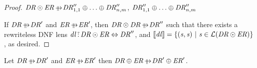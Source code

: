 \documentclass[numbers,10pt,preprint\ifanon ,nocopyrightspace\fi]{sigplanconf}
\begin{document}
\begin{proof}
  $\DNFRegex \ConcatDNF \DNFRegexAlt \ParallelRewrite
  \DNFRegex_{1,1}'' \OrDNF \ldots \OrDNF \DNFRegex_{n,m}''$,
  $\mathit{DR}_{1,1}'' \oplus \ldots \oplus \mathit{DR}_{n,m}''$
  
  If $\DNFRegex \ParallelRewrite \DNFRegex'$ and
  $\DNFRegexAlt \ParallelRewrite \DNFRegexAlt'$, then
  $\DNFRegex \ConcatDNF \DNFRegex \ParallelRewrite \DNFRegex''$ such that there
  exists a rewriteless DNF lens
  $\mathit{dl} \,\tilde{:}\,
  \mathit{DR} \odot \mathit{ER} \Leftrightarrow \mathit{DR}''$, and
  $[ \! [\mathit{dl}] \! ] =
  \{(\mathit{s},\mathit{s}) ~|~ \mathit{s} \in
    \mathcal{L}(\mathit{DR} \odot \mathit{ER})\}$,
  as desired.
\end{proof}

\begin{lemma}
  \label{lem:parallel-rewrite-or}
  Let $\DNFRegex \ParallelRewrite \DNFRegex'$ and $\DNFRegexAlt
  \ParallelRewrite \DNFRegexAlt'$ then
  $\DNFRegex \OrDNF \DNFRegexAlt \ParallelRewrite
  \DNFRegex' \OrDNF \DNFRegexAlt'$.
\end{lemma}
\end{document}
